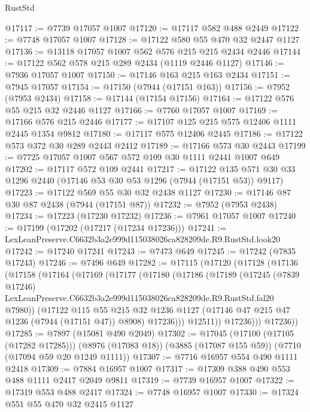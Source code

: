 \begin{lexlean}{RustStd}
\begin{coremodule}
@17117 := @7739 @17057 @1007
@17120 := @17117 @582 @488 @2449
@17122 := @7748 @17057 @1007
@17128 := @17122 @580 @55 @470 @32 @2447 @1127
@17136 := @13118 @17057 @1007 @562 @576 @215 @215 @2434 @2446
@17144 := @17122 @562 @578 @215 @289 @2434 (@1119 @2446 @1127)
@17146 := @7936 @17057 @1007
@17150 := @17146 @163 @215 @163 @2434
@17151 := @7945 @17057
@17154 := @17150 (@7944 (@17151 @163))
@17156 := @7952 (@7953 @2434)
@17158 := @17144 (@17154 @17156)
@17164 := @17122 @576 @55 @215 @32 @2446 @1127
@17166 := @7760 @17057 @1007
@17169 := @17166 @576 @215 @2446
@17177 := @17107 @125 @215 @575 @12406 @1111 @2445 @1354 @9812
@17180 := @17117 @575 @12406 @2445
@17186 := @17122 @573 @372 @30 @289 @2443 @2412
@17189 := @17166 @573 @30 @2443
@17199 := @7725 @17057 @1007 @567 @572 @109 @30 @1111 @2441 @1007 @649
@17202 := @17117 @572 @109 @2441
@17217 := @17122 @135 @571 @30 @33 @1296 @2440 (@17146 @53 @30 @53 @1296 (@7944 (@17151 @53)) @9117)
@17223 := @17122 @569 @55 @30 @32 @2438 @1127
@17230 := @17146 @87 @30 @87 @2438 (@7944 (@17151 @87))
@17232 := @7952 (@7953 @2438)
@17234 := @17223 (@17230 @17232)
@17236 := @7961 @17057 @1007
@17240 := @17199 (@17202 (@17217 (@17234 @17236)))
@17241 := LexLeanPreserve.C6632b3a2e999d115038026ca828209de.R9.RustStd.look20
@17242 := @17240 @17241
@17243 := @7473 @649
@17245 := @17242 (@7835 @17243)
@17246 := @7496 @649
@17282 := @17115
    (@17120
      (@17128
        (@17136
          (@17158
            (@17164
              (@17169
                (@17177
                  (@17180
                    (@17186
                      (@17189
                        (@17245
                          (@7839 @17246)
                          LexLeanPreserve.C6632b3a2e999d115038026ca828209de.R9.RustStd.fal20
                          @7980))
                      (@17122
                        @115
                        @55
                        @215
                        @32
                        @1236
                        @1127
                        (@17146 @47 @215 @47 @1236 (@7944 (@17151 @47)) @8908)
                        @17236)))
                  @12511))
              @17236)))
        @17236))
@17285 := @7897 (@15081 @490 @2049)
@17302 := @17045
    (@17100 (@17105 (@17282 @17285)))
    (@8976 (@17083 @18))
    (@3885 (@17087 @155 @59))
    (@7710 (@17094 @59 @20 @1249 @1111))
@17307 := @7716 @16957 @554 @490 @1111 @2418
@17309 := @7884 @16957 @1007
@17317 := @17309 @388 @490 @553 @488 @1111 @2417 @2049 @9811
@17319 := @7739 @16957 @1007
@17322 := @17319 @553 @488 @2417
@17324 := @7748 @16957 @1007
@17330 := @17324 @551 @55 @470 @32 @2415 @1127

\end{coremodule}
\end{lexlean}
